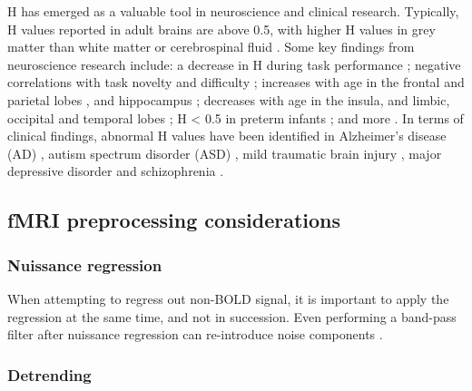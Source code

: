 \documentclass[
  sn-vancouver,
  Numbered,
  referee,
  lineno]{sn-jnl}
\begin{document}
H has emerged as a valuable tool in neuroscience and clinical research.
Typically, H values reported in adult brains are above 0.5, with higher
H values in grey matter than white matter or cerebrospinal fluid
\citep{dongHurstExponentAnalysis2018, winkMonofractalMultifractalDynamics2008}.
Some key findings from neuroscience research include: a decrease in H
during task performance
\citep{ciuciuInterplayFunctionalConnectivity2014, heScaleFreePropertiesFunctional2011};
negative correlations with task novelty and difficulty
\citep{churchillSuppressionScalefreeFMRI2016}; increases with age in the
frontal and parietal lobes \citep{dongHurstExponentAnalysis2018}, and
hippocampus \citep{winkAgeCholinergicEffects2006}; decreases with age in
the insula, and limbic, occipital and temporal lobes
\citep{dongHurstExponentAnalysis2018}; H \textless{} 0.5 in preterm
infants \citep{mellaTemporalComplexityBOLDsignal2024}; and more
\citep{campbellMonofractalAnalysisFunctional2022}. In terms of clinical
findings, abnormal H values have been identified in Alzheimer's disease
(AD)
\citep{maximFractionalGaussianNoise2005, warsiCorrelatingBrainBlood2012},
autism spectrum disorder (ASD)
\citep{donaTemporalFractalAnalysis2017, laiShiftRandomnessBrain2010, linkeAlteredDevelopmentHurst2024, uscatescuUsingExcitationInhibition2022},
mild traumatic brain injury \citep{donaFractalAnalysisBrain2017}, major
depressive disorder
\citep{weiIdentifyingMajorDepressive2013, jingIdentifyingCurrentRemitted2017}
and schizophrenia
\citep{sokunbiNonlinearComplexityAnalysis2014, uscatescuUsingExcitationInhibition2022}.

\subsection{fMRI preprocessing
considerations}\label{fmri-preprocessing-considerations-2}

\subsubsection{Nuissance regression}\label{nuissance-regression-2}

When attempting to regress out non-BOLD signal, it is important to apply
the regression at the same time, and not in succession. Even performing
a band-pass filter after nuissance regression can re-introduce noise
components \citep{lindquistModularPreprocessingPipelines2019}.

\subsubsection{Detrending}\label{detrending-2}
\end{document}
